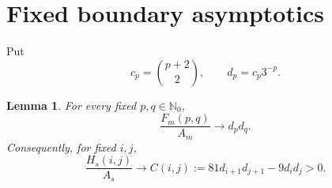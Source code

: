 \documentclass[11pt,letterpaper]{article}
\newtheorem{lemma}[theorem]{Lemma}
\theoremstyle{remark}\newtheorem{remark}[theorem]{Remark}
\numberwithin{equation}{section}
\newcommand{\N}{\mathbb N_0}
\begin{document}
\section{Fixed boundary asymptotics}\label{upo:amp:sec:fixed}
Put
\begin{equation}\label{upo:amp:eq:d}
c_p=\binom{p+2}{2},\qquad d_p=c_p3^{-p}.
\end{equation}
\begin{lemma}\label{upo:amp:lem:fixed}
For every fixed $p,q\in\N$,
\begin{equation}\label{upo:amp:eq:fixed}
\frac{F_m(p,q)}{A_m}\longrightarrow d_pd_q.
\end{equation}
Consequently, for fixed $i,j$,
\begin{equation}\label{upo:amp:eq:Climit}
\frac{H_s(i,j)}{A_s}\longrightarrow
C(i,j):=81d_{i+1}d_{j+1}-9d_id_j>0.
\end{equation}
\end{lemma}
\end{document}
